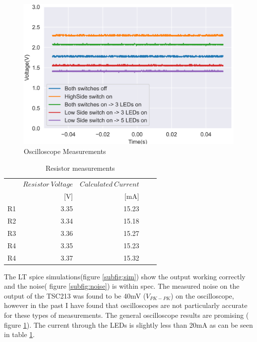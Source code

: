 \begin{figure}[!htb]
\centering
\includegraphics[scale=0.7]{./Figures/meas.png}
\caption{Oscilloscope Measurements}
\label{fig:meas}
\end{figure}

\begin{table}[!htb]
        \centering
        \footnotesize
        \caption{Resistor measurements}
         \begin{tabular}{lrrrr}
          \toprule
             & $Resistor \ Voltage$ & $Calculated \ Current$ \\
             &  [V]  & [mA]\\
          \midrule
         R1      & 3.35 & 15.23 \\
          R2 & 3.34   & 15.18 \\
          R3       &3.36 & 15.27 \\
          R4        &3.35 & 15.23 \\
          R4        &3.37 &15.32 \\
          \bottomrule
        \end{tabular}
     \label{tab:PVresults}
\end{table}
The LT spice simulations(figure \ref{subfig:sim}) show the output working correctly and the noise( figure \ref{subfig:noise}) is within spec. The measured noise on the output of the TSC213 was found to be 40mV ($V_{PK-PK}$) on the oscilloscope, however in the past I have found that oscilloscopes are not particularly accurate for these types of measurements. The general oscilloscope results are promising ( figure \ref{fig:meas}). The current through the LEDs is slightly less than 20mA as can be seen in table \ref{tab:PVresults}.
\vfill


